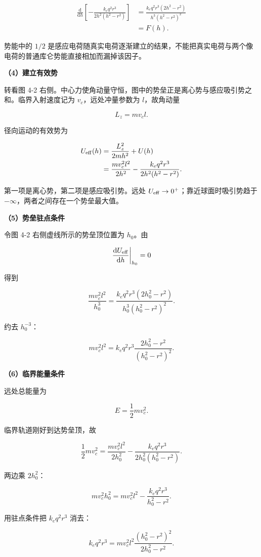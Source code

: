 \documentclass[12pt,a4paper,UTF8]{ctexart}
\begin{document}
\[
\begin{aligned}
\frac{\mathrm{d}}{\mathrm{d}h}\left[-\frac{k_eq^2r^3}{2h^2(h^2-r^2)}\right]
&=\frac{k_eq^2r^3(2h^2-r^2)}{h^3(h^2-r^2)^2}\\
&=F(h).
\end{aligned}
\]

势能中的 \(1/2\)
是感应电荷随真实电荷逐渐建立的结果，不能把真实电荷与两个像电荷的普通库仑势能直接相加而漏掉该因子。

\textbf{（4）建立有效势}

转看图 4-2
右侧。中心力使角动量守恒，图中的势垒正是离心势与感应吸引势之和。临界入射速度记为
\(v_c\)，远处冲量参数为 \(l\)，故角动量

\[
L_z=mv_cl.
\]

径向运动的有效势为

\[
\begin{aligned}
U_{\rm eff}(h)
&=\frac{L_z^2}{2mh^2}+U(h)\\
&=\frac{mv_c^2l^2}{2h^2}
-\frac{k_eq^2r^3}{2h^2(h^2-r^2)}.
\end{aligned}
\]

第一项是离心势，第二项是感应吸引势。远处
\(U_{\rm eff}\to0^+\)；靠近球面时吸引势趋于
\(-\infty\)，两者之间存在一个势垒最大值。

\textbf{（5）势垒驻点条件}

令图 4-2 右侧虚线所示的势垒顶位置为 \(h_0\)。由

\[\left.\frac{\mathrm{d}U_{\rm eff}}{\mathrm{d}h}\right|_{h_0}=0\]

得到

\[
\frac{mv_c^2l^2}{h_0^3}
=\frac{k_eq^2r^3(2h_0^2-r^2)}{h_0^3(h_0^2-r^2)^2}.
\]

约去 \(h_0^{-3}\)：

\[
\boxed{
mv_c^2l^2
=k_eq^2r^3\frac{2h_0^2-r^2}{(h_0^2-r^2)^2}
}.
\]

\textbf{（6）临界能量条件}

远处总能量为

\[E=\frac12mv_c^2.\]

临界轨道刚好到达势垒顶，故

\[
\frac12mv_c^2
=\frac{mv_c^2l^2}{2h_0^2}
-\frac{k_eq^2r^3}{2h_0^2(h_0^2-r^2)}.
\]

两边乘 \(2h_0^2\)：

\[
mv_c^2h_0^2
=mv_c^2l^2-\frac{k_eq^2r^3}{h_0^2-r^2}.
\]

用驻点条件把 \(k_eq^2r^3\) 消去：

\[
k_eq^2r^3
=mv_c^2l^2\frac{(h_0^2-r^2)^2}{2h_0^2-r^2}.
\]
\end{document}

